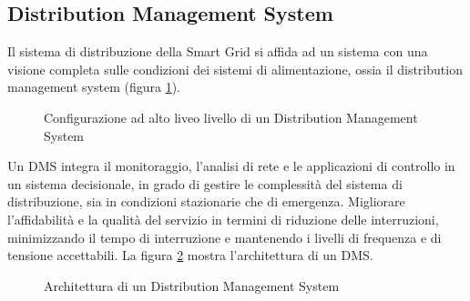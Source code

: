 \subsection{Distribution Management System}
Il sistema di distribuzione della Smart Grid si affida ad un sistema con una visione completa sulle condizioni dei sistemi di alimentazione, ossia il distribution management system (figura \ref{fig:2_10}). 

\begin{figure}[h] 
\caption{Configurazione ad alto liveo livello di un Distribution Management System}\label{fig:2_10}
\end{figure}

Un DMS integra il monitoraggio, l'analisi di rete e le applicazioni di controllo in un sistema decisionale, in grado di gestire le complessità del sistema di distribuzione, sia in condizioni stazionarie che di emergenza. Migliorare l'affidabilità e la qualità del servizio in termini di riduzione delle interruzioni, minimizzando il tempo di interruzione e mantenendo i livelli di frequenza e di tensione accettabili.  
La figura \ref{fig:2_11} mostra l'architettura di un DMS.

\begin{figure}[h] 
\caption{Architettura di un Distribution Management System}\label{fig:2_11}
\end{figure}

